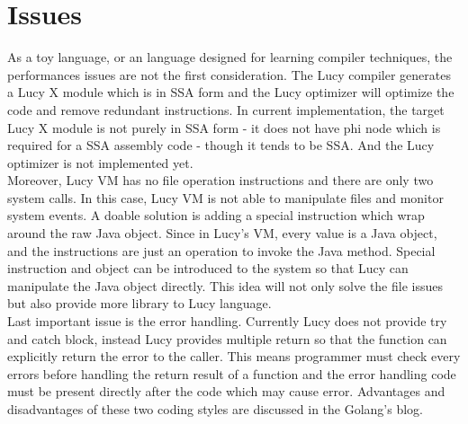 \section{Issues}
As a toy language, or an language designed for learning compiler techniques, the performances issues are not the first consideration. The Lucy compiler generates a Lucy X module which is in SSA form and the Lucy optimizer will optimize the code and remove redundant instructions. In current implementation, the target Lucy X module is not purely in SSA form - it does not have phi node which is required for a SSA assembly code - though it tends to be SSA. And the Lucy optimizer is not implemented yet. \\
Moreover, Lucy VM has no file operation instructions and there are only two system calls. In this case, Lucy VM is not able to manipulate files and monitor system events. A doable solution is adding a special instruction which wrap around the raw Java object. Since in Lucy's VM, every value is a Java object, and the instructions are just an operation to invoke the Java method. Special instruction and object can be introduced to the system so that Lucy can manipulate the Java object directly. This idea will not only solve the file issues but also provide more library to Lucy language. \\
Last important issue is the error handling. Currently Lucy does not provide try and catch block, instead Lucy provides multiple return so that the function can explicitly return the error to the caller. This means programmer must check every errors before handling the return result of a function and the error handling code must be present directly after the code which may cause error. Advantages and disadvantages of these two coding styles are discussed in the Golang's blog.
